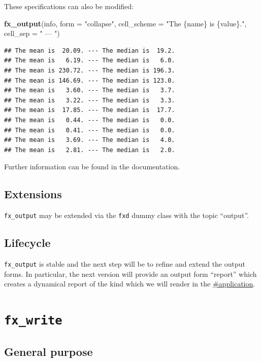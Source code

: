 \documentclass[]{report}
\newenvironment{Shaded}{\begin{snugshade}}{\end{snugshade}}
\newcommand{\KeywordTok}[1]{\textcolor[rgb]{0.13,0.29,0.53}{\textbf{#1}}}
\newcommand{\DataTypeTok}[1]{\textcolor[rgb]{0.13,0.29,0.53}{#1}}
\newcommand{\StringTok}[1]{\textcolor[rgb]{0.31,0.60,0.02}{#1}}
\newcommand{\NormalTok}[1]{#1}
\theoremstyle{definition}
\theoremstyle{definition}
\theoremstyle{definition}
\theoremstyle{remark}
\begin{document}
These specifications can also be modified:

\begin{Shaded}
\begin{Highlighting}[]
\KeywordTok{fx_output}\NormalTok{(info, }\DataTypeTok{form =} \StringTok{"collapse"}\NormalTok{, }\DataTypeTok{cell_scheme =} \StringTok{"The \{name\} is \{value\}."}\NormalTok{, }\DataTypeTok{cell_sep =} \StringTok{" --- "}\NormalTok{)}
\end{Highlighting}
\end{Shaded}

\begin{verbatim}
## The mean is  20.09. --- The median is  19.2.
## The mean is   6.19. --- The median is   6.0.
## The mean is 230.72. --- The median is 196.3.
## The mean is 146.69. --- The median is 123.0.
## The mean is   3.60. --- The median is   3.7.
## The mean is   3.22. --- The median is   3.3.
## The mean is  17.85. --- The median is  17.7.
## The mean is   0.44. --- The median is   0.0.
## The mean is   0.41. --- The median is   0.0.
## The mean is   3.69. --- The median is   4.0.
## The mean is   2.81. --- The median is   2.0.
\end{verbatim}

Further information can be found in the documentation.

\subsection{Extensions}\label{extensions-2}

\texttt{fx\_output} may be extended via the \texttt{fxd} dummy class
with the topic ``output''.

\subsection{Lifecycle}\label{lifecycle-2}

\texttt{fx\_output} is stable and the next step will be to refine and
extend the output forms. In particular, the next version will provide an
output form ``report'' which creates a dynamical report of the kind
which we will render in the \href{fifth\%20chapter}{\#application}.

\section{\texorpdfstring{\texttt{fx\_write}}{fx\_write}}\label{fx_write}

\subsection{General purpose}\label{general-purpose-3}
\end{document}
